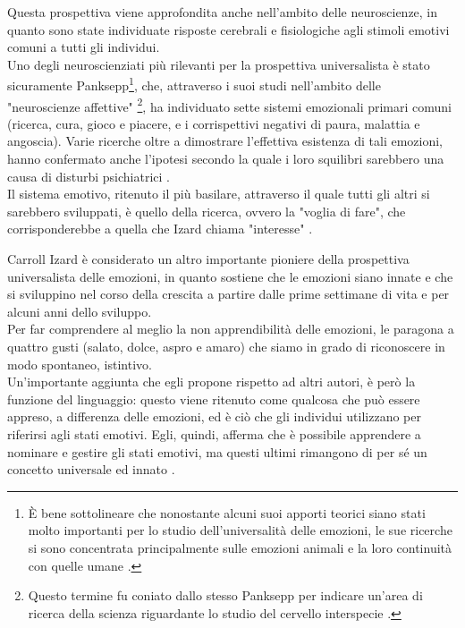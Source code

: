 Questa prospettiva viene approfondita anche nell'ambito delle neuroscienze, in quanto sono state individuate risposte cerebrali e fisiologiche agli stimoli emotivi comuni a tutti gli individui.\\
Uno degli neuroscienziati più rilevanti per la prospettiva universalista è stato sicuramente Panksepp\footnote{È bene sottolineare che nonostante alcuni suoi apporti teorici siano stati molto importanti per lo studio dell'universalità delle emozioni, le sue ricerche si sono concentrata principalmente sulle emozioni animali e la loro continuità con quelle umane \parencite{panksepp_libro}.}, che, attraverso i suoi studi nell'ambito delle "neuroscienze affettive" \footnote{Questo termine fu coniato dallo stesso Panksepp per indicare un'area di ricerca della scienza riguardante lo studio del cervello interspecie \parencite{panksepp_articolo}.}, ha individuato sette sistemi emozionali primari comuni (ricerca, cura, gioco e piacere, e i corrispettivi negativi di paura, malattia e angoscia). Varie ricerche oltre a dimostrare l'effettiva esistenza di tali emozioni, hanno confermato anche l'ipotesi secondo la quale i loro squilibri sarebbero una causa di disturbi psichiatrici \parencite{panksepp_articolo}.\\
Il sistema emotivo, ritenuto il più basilare, attraverso il quale tutti gli altri si sarebbero sviluppati, è quello della ricerca, ovvero la "voglia di fare", che corrisponderebbe a quella che Izard chiama "interesse" \parencite{panksepp_izard}. 

Carroll Izard è considerato un altro importante pioniere della prospettiva universalista delle emozioni, in quanto sostiene che le emozioni siano innate e che si sviluppino nel corso della crescita a partire dalle prime settimane di vita e per alcuni anni dello sviluppo.\\
Per far comprendere al meglio la non apprendibilità delle emozioni, le paragona a quattro gusti (salato, dolce, aspro e amaro) che siamo in grado di riconoscere in modo spontaneo, istintivo.\\
Un'importante aggiunta che egli propone rispetto ad altri autori, è però la funzione del linguaggio: questo viene ritenuto come qualcosa che può essere appreso, a differenza delle emozioni, ed è ciò che gli individui utilizzano per riferirsi agli stati emotivi. Egli, quindi, afferma che è possibile apprendere a nominare e gestire gli stati emotivi, ma questi ultimi rimangono di per sé un concetto universale ed innato \parencite{izard_intro}. 

